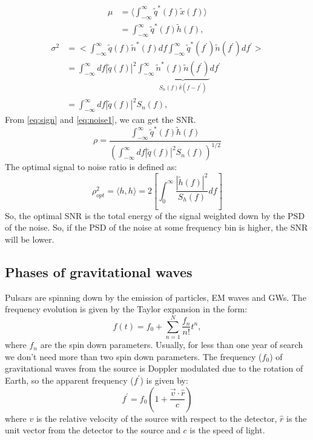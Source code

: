 \documentclass{ttuthes2007}
\begin{document}
\begin{equation}\label{eq:sign}
\begin{split}
\mu & = \langle\int_{-\infty}^{\infty}\tilde{q}^{*}(f)\tilde{x}(f)\rangle\\
&=\int_{-\infty}^{\infty}\tilde{q}^{*}(f)\tilde{h}(f),
\end{split}
\end{equation}
\begin{equation}\label{eq:noise1}
\begin{split}
\sigma^{2} & =<\int_{-\infty}^{\infty}\tilde{q}(f)\tilde{n}^{*}(f)df
\int_{-\infty}^{\infty} \tilde{q}^{*}(f^{'}) \tilde{n}(f^{'})df^{'}>\\
       &= \int_{-\infty}^{\infty}df|\tilde{q}(f)|^{2}
\int_{-\infty}^{\infty}\underbrace{\tilde{n}^{*}(f)
\tilde{n}(f^{'})}_{S_{n}(f)\delta(f - f^{'})}df^{'}\\
      &=\int_{-\infty}^{\infty}df|\tilde{q}(f)|^{2} S_{n}(f),
\end{split}
\end{equation}
From \ref{eq:sign} and \ref{eq:noise1}, we can get the \ac{SNR}.
\begin{equation}
\rho=\frac{\int_{-\infty}^{\infty}\tilde{q}^{*}(f)\tilde{h}(f)}{(\int_{-\infty}^{\infty}df|\tilde{q}(f)|^2
S_{n}(f))^{1/2}}
\end{equation}
The optimal signal to noise ratio is defined as:
\begin{equation}
\rho_{opt}^2 = \langle h,h \rangle
=2\left[\int_{0}^{\infty}\frac{|\tilde{h}(f)|^2}{S_{h}(f)}df\right]
\end{equation}
So, the optimal \ac{SNR} is the total energy of the signal weighted down by the
\ac{PSD} of the noise. So, if the \ac{PSD} of the noise at some frequency bin is higher,
the \ac{SNR} will be lower.


\subsection{Phases of gravitational waves}
Pulsars are spinning down by the emission of particles, \ac{EM} waves and \acp{GW}.
The frequency evolution is given by the Taylor expansion in the form:
\begin{equation}
f(t) = f_0 + \sum_{n=1}^{N} \frac{f_n}{n!}t^n,
\end{equation}
where $f_n$ are the spin down parameters. Usually, for less than one year of
search we don't need more than two spin down parameters. 
The frequency ($f_0$) of gravitational waves from the source is Doppler modulated due to the
rotation of Earth, so the apparent frequency ($f^\prime$) is given by:
\begin{equation} 
f^\prime = f_0 \left(1+\frac{\vec{v}\cdot\hat{r}}{c}\right)
\end{equation}
where $v$ is the relative velocity of the source with respect to the detector, $\hat{r}$
is the unit vector from the detector to the source and $c$ is the speed of light.
\end{document}
